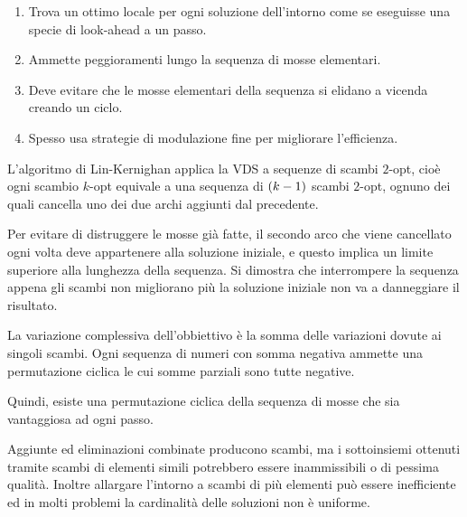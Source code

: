 \documentclass[\main/main.tex]{subfiles}
\begin{document}
\begin{multicols}{2}
\begin{observation}
    \begin{enumerate}
    \item Trova un ottimo locale per ogni soluzione dell'intorno come se eseguisse una specie di look-ahead a un passo.
    \item Ammette peggioramenti lungo la sequenza di mosse elementari.
    \item Deve evitare che le mosse elementari della sequenza si elidano a vicenda creando un ciclo.
    \item Spesso usa strategie di modulazione fine per migliorare l'efficienza.
\end{enumerate}
\end{observation}
\begin{definition}
    L'algoritmo di Lin-Kernighan applica la VDS a sequenze di scambi \(2\)-opt, cioè ogni scambio \(k\)-opt equivale a una sequenza di \(\left(k-1\right)\) scambi \(2\)-opt, ognuno dei quali cancella uno dei due archi aggiunti dal precedente.
\end{definition}
\begin{observation}
    Per evitare di distruggere le mosse già fatte, il secondo arco che viene cancellato ogni volta deve appartenere alla soluzione iniziale, e questo implica un limite superiore alla lunghezza della sequenza. Si dimostra che interrompere la sequenza appena gli scambi non migliorano più la soluzione iniziale non va a danneggiare il risultato.
    
    La variazione complessiva dell'obbiettivo è la somma delle variazioni dovute ai singoli scambi. Ogni sequenza di numeri con somma negativa ammette una permutazione ciclica le cui somme parziali sono tutte negative.
    
    Quindi, esiste una permutazione ciclica della sequenza di mosse che sia vantaggiosa ad ogni passo.
\end{observation}
\begin{definition}
    Aggiunte ed eliminazioni combinate producono scambi, ma i sottoinsiemi ottenuti tramite scambi di elementi simili potrebbero essere inammissibili o di pessima qualità. Inoltre allargare l'intorno a scambi di più elementi può essere inefficiente ed in molti problemi la cardinalità delle soluzioni non è uniforme.


\end{definition}
\end{multicols}
\end{document}
